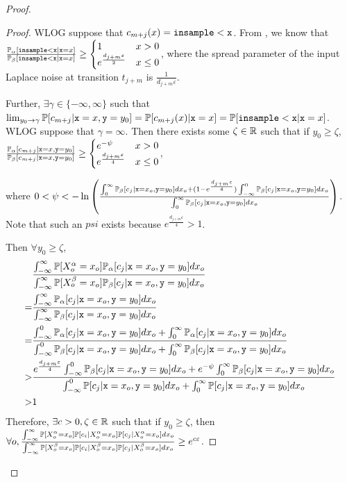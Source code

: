 \begin{proof}
\begin{proof}
	WLOG suppose that $c_{m+j}(x)=\lguard[\texttt{x}]$. From \cite{chadhaLinearTimeDecidability2021}, we know that $\frac{\PP_\alpha[\lguard[\texttt{x}]|\texttt{x} = x]}{\PP_\beta[\lguard[\texttt{x}]|\texttt{x} = x]}\geq \begin{cases}
		1 & x > 0\\
		e^{\frac{d_{j+m}\varepsilon}{2}} & x\leq 0
	\end{cases}$, where the spread parameter of the input Laplace noise at transition $t_{j+m}$ is $\frac{1}{d_{j+m}\varepsilon}$. 

	Further, $\exists \gamma \in \{-\infty, \infty\}$ such that $\lim_{y_0\to\gamma}\PP[c_{m+j}|\texttt{x}=x,\texttt{y}=y_0] = \PP[c_{m+j}(x)|\texttt{x}=x]=\PP[\lguard[\texttt{x}]|\texttt{x}=x]$. WLOG suppose that $\gamma = \infty$. Then there exists some $\zeta\in \RR$ such that if $y_0\geq \zeta$, $\frac{\PP_\alpha[c_{m+j}|\texttt{x}=x,\texttt{y}=y_0]}{\PP_\beta[c_{m+j}|\texttt{x}=x,\texttt{y}=y_0]}\geq \begin{cases}
		e^{-\psi} & x > 0\\
		e^{\frac{d_{j+m}\varepsilon}{4}} & x\leq 0
	\end{cases}$, 
	
	where $0<\psi< -\ln\left(\frac{\int_{0}^{\infty}\PP_\beta[c_j|\texttt{x} = x_o, \texttt{y}=y_0]dx_o+(1-e^{\frac{d_{j+m}\varepsilon}{4}})\int_{-\infty}^{0}\PP_\beta[c_j|\texttt{x} = x_o, \texttt{y}=y_0]dx_o}{\int_{0}^{\infty}\PP_\beta[c_j|\texttt{x} = x_o, \texttt{y}=y_0]dx_o}\right)$. Note that such an $psi$ exists because $e^{\frac{d_{j+m}\varepsilon}{4}}>1$.

	Then $\forall y_0\geq \zeta$, \begin{align*}
		&\frac{\int_{-\infty}^\infty\PP[X_o^\alpha=x_o]\PP_\alpha[c_j|\texttt{x}= x_o, \texttt{y}=y_0]dx_o}{\int_{-\infty}^\infty\PP[X_o^\beta=x_o] \PP_\beta[c_j|\texttt{x} = x_o, \texttt{y}=y_0]dx_o} \\
		=&\frac{\int_{-\infty}^\infty\PP_\alpha[c_j|\texttt{x}= x_o, \texttt{y}=y_0]dx_o}{\int_{-\infty}^\infty\PP_\beta[c_j|\texttt{x} = x_o, \texttt{y}=y_0]dx_o}\\
		=&\frac{\int_{-\infty}^{0}\PP_\alpha[c_j|\texttt{x}= x_o, \texttt{y}=y_0]dx_o+\int_{0}^{\infty}\PP_\alpha[c_j|\texttt{x}= x_o, \texttt{y}=y_0]dx_o}{\int_{-\infty}^{0}\PP_\beta[c_j|\texttt{x} = x_o, \texttt{y}=y_0]dx_o+\int_{0}^{\infty}\PP_\beta[c_j|\texttt{x} = x_o, \texttt{y}=y_0]dx_o}\\
		>& \frac{e^{\frac{d_{j+m}\varepsilon}{4}}\int_{-\infty}^{0}\PP_\beta[c_j|\texttt{x} = x_o, \texttt{y}=y_0]dx_o+e^{-\psi}\int_{0}^{\infty}\PP_\beta[c_j|\texttt{x} = x_o, \texttt{y}=y_0]dx_o}{\int_{-\infty}^{0}\PP[c_j|\texttt{x} = x_o, \texttt{y}=y_0]dx_o+\int_{0}^{\infty}\PP[c_j|\texttt{x} = x_o, \texttt{y}=y_0]dx_o}\\
		>&1
	\end{align*}
	Therefore, $\exists c>0, \zeta\in\RR$ such that if $y_0\geq \zeta$, then $\forall o, \frac{\int_{-\infty}^\infty\PP[X_o^\alpha=x_o]\PP[c_i|X_o^\alpha = x_o]\PP[c_j|X_o^\alpha = x_o]dx_o}{\int_{-\infty}^\infty\PP[X_o^\beta=x_o] \PP[c_i|X_o^\beta = x_o]\PP[c_j|X_o^\beta = x_o]dx_o}\geq e^{c\varepsilon}$.
\end{proof}



\end{proof}
